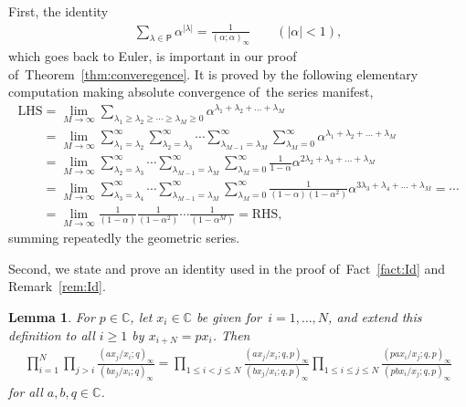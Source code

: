 \documentclass[pdftex]{sigma}%
\numberwithin{equation}{section}
\newtheorem{Lemma}[Theorem]{Lemma}
\newcommand{\C}{{\mathbb C}}
\begin{document}
First, the identity
\begin{gather}\label{Euler}
\sum_{\lambda\in\mathsf{P}}\alpha^{|\lambda|} = \frac1{(\alpha;\alpha)_\infty} \qquad (|\alpha|<1),
\end{gather}
which goes back to Euler, is important in our proof of~Theorem~\ref{thm:converegence}. It is proved by the following elementary computation making absolute convergence of~the series manifest,
\begin{gather}
\text{LHS} = \lim_{M\to\infty} \sum_{\lambda_1\geq \lambda_2\geq \cdots\geq \lambda_M\geq 0} \alpha^{\lambda_1+\lambda_2+\dots+\lambda_M}\nonumber
\\ \phantom{\text{LHS}}
{}= \lim_{M\to\infty} \sum_{\lambda_1=\lambda_2}^\infty \sum_{\lambda_2=\lambda_3}^\infty \cdots \sum_{\lambda_{M-1}=\lambda_M}^\infty \sum_{\lambda_M=0}^\infty \alpha^{\lambda_1+\lambda_2+\dots+\lambda_M}\nonumber
\\ \phantom{\text{LHS}}
{}= \lim_{M\to\infty} \sum_{\lambda_2=\lambda_3}^\infty \cdots \sum_{\lambda_{M-1}=\lambda_M}^\infty \sum_{\lambda_M=0}^\infty \frac{1}{1-\alpha}
\alpha^{2\lambda_2+\lambda_3 +\dots+\lambda_M}\nonumber
\\ \phantom{\text{LHS}}
{}= \lim_{M\to\infty} \sum_{\lambda_3=\lambda_4}^\infty \cdots \sum_{\lambda_{M-1}=\lambda_M}^\infty \sum_{\lambda_M=0}^\infty \frac{1}{(1-\alpha)(1-\alpha^2)}
\alpha^{3\lambda_3+\lambda_4 +\dots+\lambda_M} = \cdots \nonumber
\\ \phantom{\text{LHS}}
{}= \lim_{M\to\infty} \frac1{(1-\alpha)} \frac1{(1-\alpha^2)}\cdots \frac1{(1-\alpha^M)} = \text{RHS},
\label{Euler1}
\end{gather}
summing repeatedly the geometric series.

Second, we state and prove an identity used in the proof of~Fact~\ref{fact:Id} and Remark~\ref{rem:Id}.

\begin{Lemma}\label{lem:Id2}For $p\in\C$, let $x_i\in\C$ be given for~$i=1,\dots,N$, and extend this definition to all $i\geq 1$ by $x_{i+N}=px_i$. Then
\begin{gather*}
\prod_{i=1}^N \prod_{j>i} \frac{(ax_j/x_i;q)_\infty}{(bx_j/x_i;q)_\infty} =
\prod_{1\leq i<j\leq N}\frac{(ax_j/x_i;q,p)_\infty}{(bx_j/x_i;q,p)_\infty}
\prod_{1\leq i\leq j\leq N}\frac{(pax_i/x_j;q,p)_\infty}{(pbx_i/x_j;q,p)_\infty}
\end{gather*}
for all $a, b, q\in\C$.
\end{Lemma}
\end{document}
